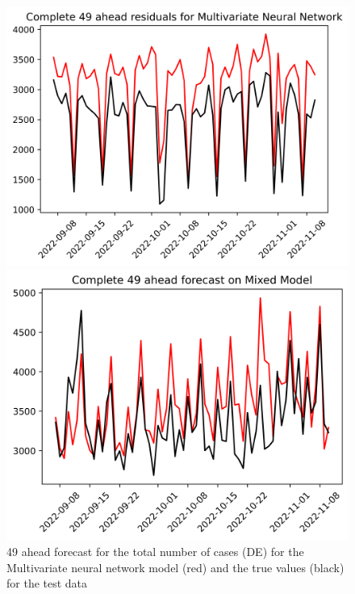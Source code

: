 \begin{figure}

\begin{minipage}{.32\textwidth}
  \centering
  \includegraphics[width=\linewidth]{pics/49_ah/DE_Complete_49_ahead_Multivariate Neural Network.png}
  \caption{49 ahead forecast for the total number of cases (DE) for the Multivariate neural network model (red) and the true values (black) for the test data}
  \label{fig:tot_cases_fc_49_mvnn_DE}
\end{minipage}
\begin{minipage}{.32\textwidth}
  \centering
  \includegraphics[width=\linewidth]{pics/49_ah/Complete_49_ahead_Mixed Model.png}

\end{minipage}
\end{figure}
